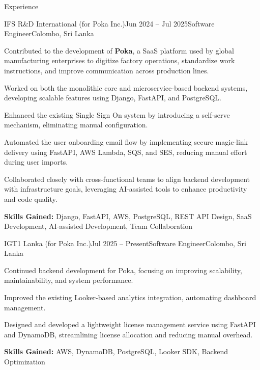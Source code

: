 \documentclass[11pt]{resume}
\begin{document}
\begin{rSection}{Experience}

\begin{rSubsection}{IFS R\&D International (for Poka Inc.)}{Jun 2024 – Jul 2025}{Software Engineer}{Colombo, Sri Lanka}
\item Contributed to the development of \textbf{Poka}, a SaaS platform used by global manufacturing enterprises to digitize factory operations, standardize work instructions, and improve communication across production lines.
\item Worked on both the monolithic core and microservice-based backend systems, developing scalable features using Django, FastAPI, and PostgreSQL.
\item Enhanced the existing Single Sign On system by introducing a self-serve mechanism, eliminating manual configuration.
\item Automated the user onboarding email flow by implementing secure magic-link delivery using FastAPI, AWS Lambda, SQS, and SES, reducing manual effort during user imports.
\item Collaborated closely with cross-functional teams to align backend development with infrastructure goals, leveraging AI-assisted tools to enhance productivity and code quality.
\item \textbf{Skills Gained:} Django, FastAPI, AWS, PostgreSQL, REST API Design, SaaS Development, AI-assisted Development, Team Collaboration
\end{rSubsection}

\begin{rSubsection}{IGT1 Lanka (for Poka Inc.)}{Jul 2025 – Present}{Software Engineer}{Colombo, Sri Lanka}
\item Continued backend development for Poka, focusing on improving scalability, maintainability, and system performance.
\item Improved the existing Looker-based analytics integration, automating dashboard management.
\item Designed and developed a lightweight license management service using FastAPI and DynamoDB, streamlining license allocation and reducing manual overhead.
\item \textbf{Skills Gained:} AWS, DynamoDB, PostgreSQL, Looker SDK, Backend Optimization
\end{rSubsection}


\end{rSection}
\end{document}
